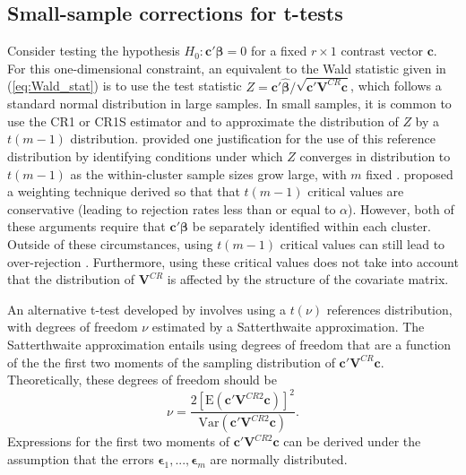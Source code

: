 \documentclass[12pt]{article}\usepackage[]{graphicx}\usepackage[]{color}
\newcommand{\E}{\text{E}}
\newcommand{\Var}{\text{Var}}
\newcommand{\bm}{\mathbf}
\newcommand{\bs}{\boldsymbol}
\begin{document}
\subsection{Small-sample corrections for t-tests}
\label{subsec:t-tests}

Consider testing the hypothesis $H_0: \bm{c}'\bs\beta = 0$ for a fixed $r \times 1$ contrast vector $\bm{c}$. 
For this one-dimensional constraint, an equivalent to the Wald statistic given in (\ref{eq:Wald_stat}) is to use the test statistic $Z = \bm{c}'\bs{\hat\beta} / \sqrt{\bm{c}'\bm{V}^{CR}\bm{c}}$, which follows a standard normal distribution in large samples. 
In small samples, it is common to use the CR1 or CR1S estimator and to approximate the distribution of $Z$ by a $t(m - 1)$ distribution. 
\citet{Hansen2007asymptotic} provided one justification for the use of this reference distribution by identifying conditions under which $Z$ converges in distribution to $t(m-1)$ as the within-cluster sample sizes grow large, with $m$ fixed \citep[see also][]{Donald2007inference}. 
\citet{Ibragimov2010tstatistic} proposed a weighting technique derived so that that $t(m-1)$ critical values are conservative (leading to rejection rates less than or equal to $\alpha$).
However, both of these arguments require that $\bm{c}'\bs\beta$ be separately identified within each cluster. 
Outside of these circumstances, using $t(m-1)$ critical values can still lead to over-rejection \citep{Cameron2015practitioners}. 
Furthermore, using these critical values does not take into account that the distribution of $\bm{V}^{CR}$ is affected by the structure of the covariate matrix. 

An alternative t-test developed by \citet{Bell2002bias} involves using a $t(\nu)$ references distribution, with degrees of freedom $\nu$ estimated by a Satterthwaite approximation.
The Satterthwaite approximation \citep{Satterthwaite1946approximate} entails using degrees of freedom that are a function of the the first two moments of the sampling distribution of $\bm{c}' \bm{V}^{CR} \bm{c}$.
Theoretically, these degrees of freedom should be 
\begin{equation}
\label{eq:nu_Satterthwaite}
\nu = \frac{2\left[\E\left(\bm{c}'\bm{V}^{CR2}\bm{c}\right)\right]^2}{\Var\left(\bm{c}'\bm{V}^{CR2}\bm{c}\right)}.
\end{equation}
Expressions for the first two moments of $\bm{c}'\bm{V}^{CR2}\bm{c}$ can be derived under the assumption that the errors $\bs\epsilon_1,...,\bs\epsilon_m$ are normally distributed. 
\end{document}
